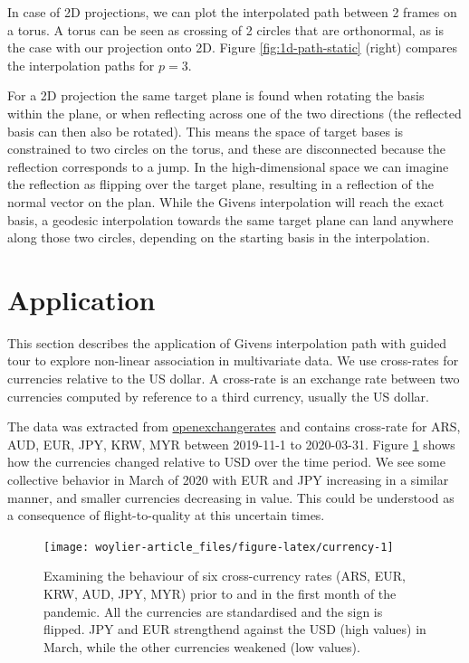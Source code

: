 In case of 2D projections, we can plot the interpolated path between 2 frames on a torus. A torus can be seen as crossing of 2 circles that are orthonormal, as is the case with our projection onto 2D. Figure \ref{fig:1d-path-static} (right) compares the interpolation paths for \(p=3\).

For a 2D projection the same target plane is found when rotating the basis within the plane, or when reflecting across one of the two directions (the reflected basis can then also be rotated). This means the space of target bases is constrained to two circles on the torus, and these are disconnected because the reflection corresponds to a jump. In the high-dimensional space we can imagine the reflection as flipping over the target plane, resulting in a reflection of the normal vector on the plan.
While the Givens interpolation will reach the exact basis, a geodesic interpolation towards the same target plane can land anywhere along those two circles, depending on the starting basis in the interpolation.

\hypertarget{application}{%
\section{Application}\label{application}}

This section describes the application of Givens interpolation path with guided tour to explore non-linear association in multivariate data. We use cross-rates for currencies relative to the US dollar. A cross-rate is an exchange rate between two currencies computed by reference to a third currency, usually the US dollar.

The data was extracted from \href{https://openexchangerates.org}{openexchangerates} and contains cross-rate for ARS, AUD, EUR, JPY, KRW, MYR between 2019-11-1 to 2020-03-31. Figure \ref{fig:currency} shows how the currencies changed relative to USD over the time period. We see some collective behavior in March of 2020 with EUR and JPY increasing in a similar manner, and smaller currencies decreasing in value. This could be understood as a consequence of flight-to-quality at this uncertain times.

\begin{figure}
\texttt{[image: woylier-article\_files/figure-latex/currency-1]} \caption{Examining the behaviour of six cross-currency rates (ARS, EUR, KRW, AUD, JPY, MYR) prior to and in the first month of the pandemic. All the currencies are standardised and the sign is flipped. JPY and EUR strengthend against the USD (high values) in March, while the other currencies weakened (low values).}\label{fig:currency}
\end{figure}

